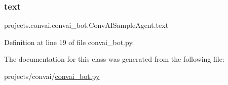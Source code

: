 \subsubsection{\texorpdfstring{text}{text}}
{\footnotesize\ttfamily projects.\+convai.\+convai\+\_\+bot.\+Conv\+A\+I\+Sample\+Agent.\+text}



Definition at line 19 of file convai\+\_\+bot.\+py.



The documentation for this class was generated from the following file\+:\begin{DoxyCompactItemize}
\item 
projects/convai/\hyperlink{convai__bot_8py}{convai\+\_\+bot.\+py}\end{DoxyCompactItemize}
